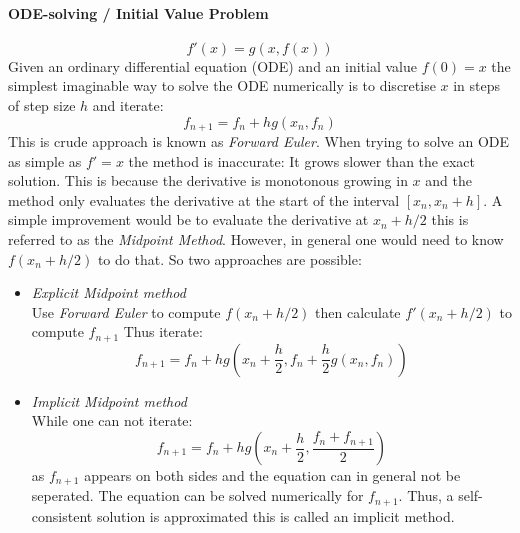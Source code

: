 \documentclass[Master]{subfiles}
\begin{document}
\paragraph {ODE-solving / Initial Value Problem}
$$
f'(x) = g(x,f(x))
$$
Given an ordinary differential equation (ODE) and an initial value $f(0)=x$ the  simplest imaginable way to solve the ODE numerically is to discretise $x$ in steps of step size $h$ and iterate:
$$
f_{n+1} = f_n + h g(x_n,f_n)
$$ 
This is crude approach is known as \textit{Forward Euler}. When trying to solve an ODE as simple as $f' = x$ the method is inaccurate: It grows slower than the exact solution. This is because the derivative is monotonous growing in $x$ and the method only evaluates the derivative at the start of the interval $[x_n,x_n+h]$. A simple improvement would be to evaluate the derivative at $x_n+ h/2$ this is referred to as the \textit{Midpoint Method}.
However, in general one would need to know $f(x_n+ h/2)$ to do that. So two approaches are possible:
\begin{itemize}
    \item \textit{Explicit Midpoint method}\\
    Use \textit{Forward Euler} to compute $f(x_n+ h/2)$ then calculate $f'(x_n+ h/2)$ to compute $f_{n+1}$ Thus iterate:
    \begin{dmath} \label{num:midpoint}
    f_{n+1} = f_n + h g(x_n +\frac{h}{2}, f_n + \frac{h}{2} g(x_n,f_n))
    \end{dmath}
    \item \textit{Implicit Midpoint method}\\
    While one can not iterate:
    $$f_{n+1}= f_n + h g(x_n +\frac{h}{2}, \frac{f_n+f_{n+1}}{2})$$
    as $f_{n+1}$ appears on both sides and the equation can in general not be seperated.
    The equation can be solved numerically for $f_{n+1}$. Thus, a self-consistent solution is approximated this is called an implicit method.
\end{itemize}
\end{document}
